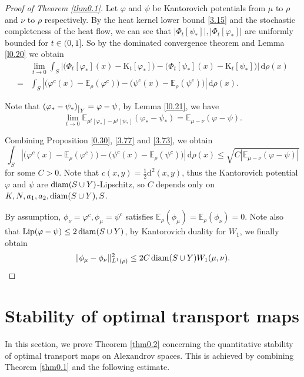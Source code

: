 \documentclass[a4paper,11pt]{article}
\numberwithin{equation}{section}
\theoremstyle{plain}
\theoremstyle{definition}
\theoremstyle{remark}
\newcommand{\E}{\mathbb{E}}
\newcommand{\K}{\mathrm{K}}
\newcommand{\diam}{\mathop{\rm diam}\nolimits}
\newcommand{\Lip}{\mathop{\rm Lip}\nolimits}
\renewcommand{\d}{{\mathrm d}}
\newcommand{\restr}[1]{\lower3pt\hbox{$|_{#1}$}}
\begin{document}
	\begin{proof}[Proof of Theorem \ref{thm0.1}]
	Let  $\varphi$ and $\psi$ be  Kantorovich potentials from  $\mu$ to $\rho$ and  $\nu$ to $\rho$ respectively.
By the heat kernel lower bound \eqref{3.15} and  the stochastic completeness of the heat flow,  we can see that $|\Phi_t[\psi_{*}]|, |\Phi_t[\varphi_{*}]| $ are uniformly   bounded for $t\in(0,1]$. So by the dominated convergence theorem and Lemma \ref{l0.20} we obtain
		\begin{equation}\label{3.77}
			\begin{aligned}
				&\lim_{t\rightarrow0}\int_{S}\left|\Big(\Phi_t[\varphi_{*}](x)-\K_t[\varphi_{*}]\Big)-\Big(\Phi_t[\psi_{*}](x)-\K_t[\psi_{*}]\Big)\right|\,\d\rho(x)\\
				=&\int_{S}\left|\Big(\varphi^c(x)-\E_\rho(\varphi^c)\Big)-\Big(\psi^c(x)-\E_\rho(\psi^c)\Big)\right|\,\d\rho(x).
			\end{aligned}
		\end{equation}
		
		
		Note that  $(\varphi_{*}-\psi_{*})\restr{Y}=\varphi-\psi$,  by Lemma \ref{l0.21}, we have
		\begin{equation}\label{3.73}
		\lim_{t\rightarrow 0}\E_{\mu^t[\varphi_{*}]-\mu^t[\psi_{*}]}(\varphi_{*}-\psi_{*})=\E_{\mu-\nu}(\varphi-\psi).
		\end{equation}
		
		Combining Proposition
		\ref{0.30}, \eqref{3.77} and \eqref{3.73}, we obtain
		\begin{equation}
	\int_{S}\left|\Big(\varphi^c(x)-\E_\rho(\varphi^c)\Big)-\Big(\psi^c(x)-\E_\rho(\psi^c)\Big)\right|\,\d\rho(x)\leq  \sqrt{C\left|\E_{\mu-\nu}(\varphi-\psi)\right|}
		\end{equation}
		for some $C>0$.  Note that  $c(x,y)=\frac{1}{2}\d^2(x,y)$,  thus the Kantorovich potential $\varphi$ and $\psi$ are $\diam(S\cup Y)$-Lipschitz,  so $C$ depends only on $K,N,a_1,a_2,\diam(S\cup Y),S$.
		
		By assumption,  $\phi_\nu=\varphi^c, \phi_\mu=\psi^c$ satisfies  $\E_\rho(\phi_\mu)=\E_\rho(\phi_\nu)=0$.  Note also that $\Lip(\varphi-\psi)\leq 2\diam(S\cup Y)$, by Kantorovich duality for $W_1$, we finally obtain
		\begin{equation}
		\|\phi_\mu-\phi_\nu\|^2_{L^1(\rho)}\leq 2C \diam(S\cup Y) W_1(\mu,\nu).
		\end{equation}
	\end{proof}
	
	
	\section{Stability of optimal transport maps}\label{sec4}
	In this section, we prove Theorem \ref{thm0.2} concerning the quantitative stability of optimal transport maps on Alexandrov spaces. This is achieved by combining Theorem \ref{thm0.1} and the following  estimate.
	
\end{document}
